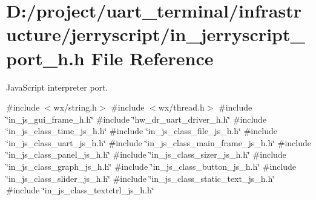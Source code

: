 \section{D\+:/project/uart\+\_\+terminal/infrastructure/jerryscript/in\+\_\+jerryscript\+\_\+port\+\_\+h.h File Reference}
\label{in__jerryscript__port__h_8h}


Java\+Script interpreter port.  


{\ttfamily \#include $<$wx/string.\+h$>$}\newline
{\ttfamily \#include $<$wx/thread.\+h$>$}\newline
{\ttfamily \#include \char`\"{}in\+\_\+js\+\_\+gui\+\_\+frame\+\_\+h.\+h\char`\"{}}\newline
{\ttfamily \#include \char`\"{}hw\+\_\+dr\+\_\+uart\+\_\+driver\+\_\+h.\+h\char`\"{}}\newline
{\ttfamily \#include \char`\"{}in\+\_\+js\+\_\+class\+\_\+time\+\_\+js\+\_\+h.\+h\char`\"{}}\newline
{\ttfamily \#include \char`\"{}in\+\_\+js\+\_\+class\+\_\+file\+\_\+js\+\_\+h.\+h\char`\"{}}\newline
{\ttfamily \#include \char`\"{}in\+\_\+js\+\_\+class\+\_\+uart\+\_\+js\+\_\+h.\+h\char`\"{}}\newline
{\ttfamily \#include \char`\"{}in\+\_\+js\+\_\+class\+\_\+main\+\_\+frame\+\_\+js\+\_\+h.\+h\char`\"{}}\newline
{\ttfamily \#include \char`\"{}in\+\_\+js\+\_\+class\+\_\+panel\+\_\+js\+\_\+h.\+h\char`\"{}}\newline
{\ttfamily \#include \char`\"{}in\+\_\+js\+\_\+class\+\_\+sizer\+\_\+js\+\_\+h.\+h\char`\"{}}\newline
{\ttfamily \#include \char`\"{}in\+\_\+js\+\_\+class\+\_\+graph\+\_\+js\+\_\+h.\+h\char`\"{}}\newline
{\ttfamily \#include \char`\"{}in\+\_\+js\+\_\+class\+\_\+button\+\_\+js\+\_\+h.\+h\char`\"{}}\newline
{\ttfamily \#include \char`\"{}in\+\_\+js\+\_\+class\+\_\+slider\+\_\+js\+\_\+h.\+h\char`\"{}}\newline
{\ttfamily \#include \char`\"{}in\+\_\+js\+\_\+class\+\_\+static\+\_\+text\+\_\+js\+\_\+h.\+h\char`\"{}}\newline
{\ttfamily \#include \char`\"{}in\+\_\+js\+\_\+class\+\_\+textctrl\+\_\+js\+\_\+h.\+h\char`\"{}}\newline
